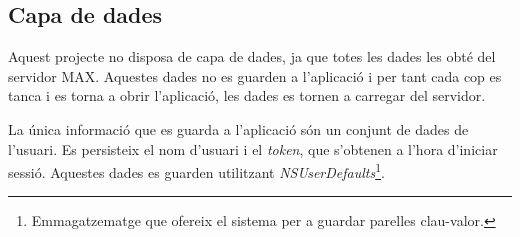 \subsection{Capa de dades}

Aquest projecte no disposa de capa de dades, ja que totes les dades les obté del servidor MAX. Aquestes dades no es guarden a l'aplicació i per tant cada cop es tanca i es torna a obrir l'aplicació, les dades es tornen a carregar del servidor.

La única informació que es guarda a l'aplicació són un conjunt de dades de l'usuari. Es persisteix el nom d'usuari i el \textit{token}, que s'obtenen a l'hora d'iniciar sessió. Aquestes dades es guarden utilitzant \textit{NSUserDefaults}\footnote{Emmagatzematge que ofereix el sistema per a guardar parelles clau-valor.}.